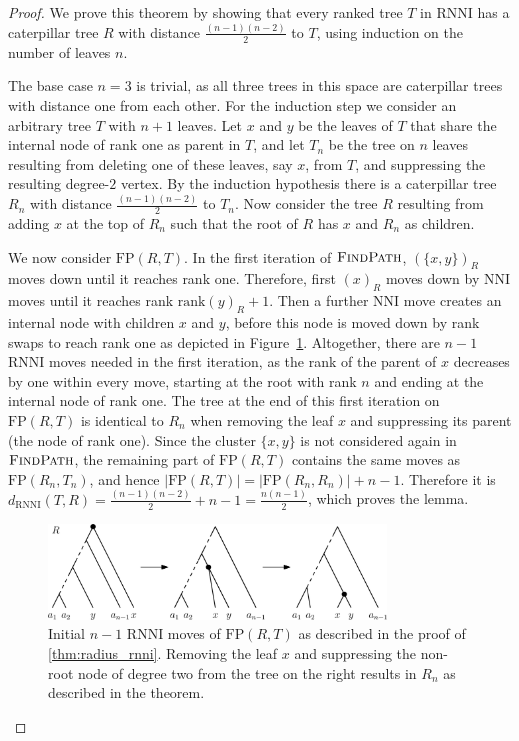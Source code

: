 \documentclass[11pt]{amsart}
\newcommand{\rnni}{\mathrm{RNNI}}
\newcommand{\findpath}{\textsc{FindPath}}
\newcommand{\rank}{\mathrm{rank}}
\newcommand{\nni}{\mathrm{NNI}}
\newcommand{\fp}{\mathrm{FP}}
\begin{document}
\begin{proof}
	We prove this theorem by showing that every ranked tree $T$ in $\rnni$ has a caterpillar tree $R$ with distance $\frac{(n-1)(n-2)}{2}$ to $T$, using induction on the number of leaves $n$.

	The base case $n=3$ is trivial, as all three trees in this space are caterpillar trees with distance one from each other.
	For the induction step we consider an arbitrary tree $T$ with $n+1$ leaves.
	Let $x$ and $y$ be the leaves of $T$ that share the internal node of rank one as parent in $T$, and let $T_n$ be the tree on $n$ leaves resulting from deleting one of these leaves, say $x$, from $T$, and suppressing the resulting degree-$2$ vertex.
	By the induction hypothesis there is a caterpillar tree $R_n$ with distance $\frac{(n-1)(n-2)}{2}$ to $T_n$.
	Now consider the tree $R$ resulting from adding $x$ at the top of $R_n$ such that the root of $R$ has $x$ and $R_n$ as children.

	We now consider $\fp(R,T)$.
	In the first iteration of $\findpath$, $(\{x,y\})_R$ moves down until it reaches rank one.
	Therefore, first $(x)_R$ moves down by $\nni$ moves until it reaches rank $\rank(y)_R + 1$.
	Then a further $\nni$ move creates an internal node with children $x$ and $y$, before this node is moved down by rank swaps to reach rank one as depicted in Figure~\ref{fig:max_dist_ctree}.
	Altogether, there are $n-1$ $\rnni$ moves needed in the first iteration, as the rank of the parent of $x$ decreases by one within every move, starting at the root with rank $n$ and ending at the internal node of rank one.
	The tree at the end of this first iteration on $\fp(R,T)$ is identical to $R_n$ when removing the leaf $x$ and suppressing its parent (the node of rank one).
	Since the cluster $\{x,y\}$ is not considered again in $\findpath$, the remaining part of $\fp(R,T)$ contains the same moves as $\fp(R_n,T_n)$, and hence $|\fp(R,T)| = |\fp(R_n,R_n)| + n-1$.
	Therefore it is $d_{\rnni}(T,R) = \frac{(n-1)(n-2)}{2} + n-1 = \frac{n(n-1)}{2}$, which proves the lemma.
	\begin{figure}[ht]
		\includegraphics[width=0.8\textwidth]{max_dist_ctree.eps}
		\caption{Initial $n - 1$ $\rnni$ moves of $\fp(R,T)$ as described in the proof of \autoref{thm:radius_rnni}.
		Removing the leaf $x$ and suppressing the non-root node of degree two from the tree on the right results in $R_n$ as described in the theorem.}
		\label{fig:max_dist_ctree}
	\end{figure}
\end{proof}
\end{document}
